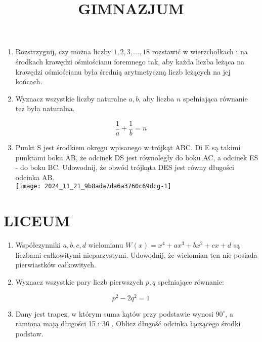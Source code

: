 \documentclass[10pt]{article}
\title{GIMNAZJUM }
\author{}
\date{}
\begin{document}
\maketitle
\begin{enumerate}
  \item Rozstrzygnij, czy można liczby \(1,2,3, \ldots, 18\) rozstawić w wierzchołkach i na środkach krawędzi ośmiościanu foremnego tak, aby każda liczba leżąca na krawędzi ośmiościanu była średnią arytmetyczną liczb leżących na jej końcach.
  \item Wyznacz wszystkie liczby naturalne \(a, b\), aby liczba \(n\) spełniająca równanie też była naturalna.
\end{enumerate}

\[
\frac{1}{a}+\frac{1}{b}=n
\]

\begin{enumerate}
  \setcounter{enumi}{2}
  \item Punkt S jest środkiem okręgu wpisanego w trójkąt ABC. Di E są takimi punktami boku AB, że odcinek DS jest równoległy do boku AC, a odcinek ES - do boku BC. Udowodnij, że obwód trójkąta DES jest równy długości odcinka AB.\\
\texttt{[image: 2024\_11\_21\_9b8ada7da6a3760c69dcg-1]}
\end{enumerate}

\section*{LICEUM}
\begin{enumerate}
  \item Współczynniki \(a, b, c, d\) wielomianu \(W(x)=x^{4}+a x^{3}+b x^{2}+c x+d\) są liczbami całkowitymi nieparzystymi. Udowodnij, że wielomian ten nie posiada pierwiastków całkowitych.
  \item Wyznacz wszystkie pary liczb pierwszych \(p, q\) spełniające równanie:
\end{enumerate}

\[
p^{2}-2 q^{2}=1
\]

\begin{enumerate}
  \setcounter{enumi}{2}
  \item Dany jest trapez, w którym suma kątów przy podstawie wynosi \(90^{\circ}\), a ramiona mają długości 15 i 36 . Oblicz długość odcinka łączącego środki podstaw.
\end{enumerate}
\end{document}
